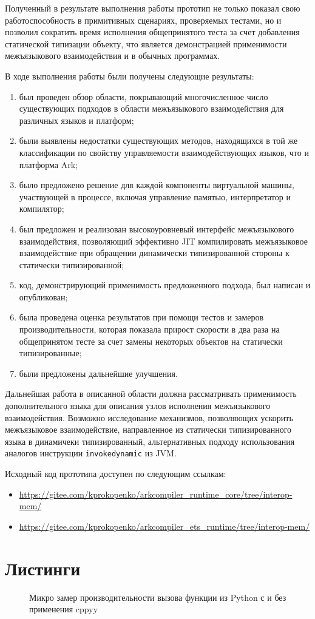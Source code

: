 \documentclass[times
,titlepage
]{itmo-student-thesis}
\begin{document}
\chapterconclusion
Полученный в результате выполнения работы прототип не только показал свою работоспособность в примитивных сценариях, проверяемых тестами, но и позволил сократить время исполнения общепринятого теста за счет добавления статической типизации объекту, что является демонстрацией применимости межъязыкового взаимодействия и в обычных программах.

\startconclusionpage
В ходе выполнения работы были получены следующие результаты:
\begin{enumerate}
	\item был проведен обзор области, покрывающий многочисленное число существующих подходов в области межъязыкового взаимодействия для различных языков и платформ;
	\item были выявлены недостатки существующих методов, находящихся в той же классификации по свойству управляемости взаимодействующих языков, что и платформа Ark;
	\item было предложено решение для каждой компоненты виртуальной машины, участвующей в процессе, включая управление памятью, интерпретатор и компилятор;
	\item был предложен и реализован высокоуровневый интерфейс межъязыкового взаимодействия, позволяющий эффективно JIT компилировать межъязыковое взаимодействие при обращении динамически типизированной стороны к статически типизированной;
	\item код, демонстрирующий применимость предложенного подхода, был написан и опубликован;
	\item была проведена оценка результатов при помощи тестов и замеров производительности, которая показала прирост скорости в два раза на общепринятом тесте за счет замены некоторых объектов на статически типизированные;
	\item были предложены дальнейшие улучшения.
\end{enumerate}

Дальнейшая работа в описанной области должна рассматривать применимость дополнительного языка для описания узлов исполнения межъязыкового взаимодействия. Возможно исследование механизмов, позволяющих ускорить межъязыковое взаимодействие, направленное из статически типизированного языка в динамичеки типизированный, альтернативных подходу использования аналогов инструкции \texttt{invokedynamic} из JVM.

Исходный код прототипа доступен по следующим ссылкам:
\begin{itemize}
	\item \url{https://gitee.com/kprokopenko/arkcompiler_runtime_core/tree/interop-mem/}
	\item \url{https://gitee.com/kprokopenko/arkcompiler_ets_runtime/tree/interop-mem/}
\end{itemize}

\printmainbibliography
\appendix

\chapter{Листинги}
\begin{figure}[!h]
	\caption{Микро замер производительности вызова функции из Python с и без применения cppyy}\label{apx:cppyy-bench}
	
\end{figure}
\end{document}
